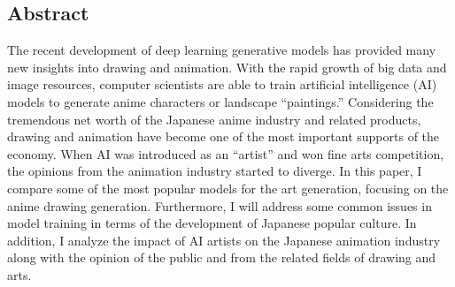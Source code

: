 \subsection*{Abstract}
The recent development of deep learning generative models has provided many new insights into drawing and animation.
With the rapid growth of big data and image resources, computer scientists are able to train artificial intelligence (AI) models to generate anime characters or landscape ``paintings.'' 
Considering the tremendous net worth of the Japanese anime industry and related products, drawing and animation have become one of the most important supports of the economy.
When AI was introduced as an ``artist'' and won fine arts competition, the opinions from the animation industry started to diverge.
In this paper, I compare some of the most popular models for the art generation, focusing on the anime drawing generation.
Furthermore, I will address some common issues in model training in terms of the development of Japanese popular culture.
In addition, I analyze the impact of AI artists on the Japanese animation industry along with the opinion of the public and from the related fields of drawing and arts.

